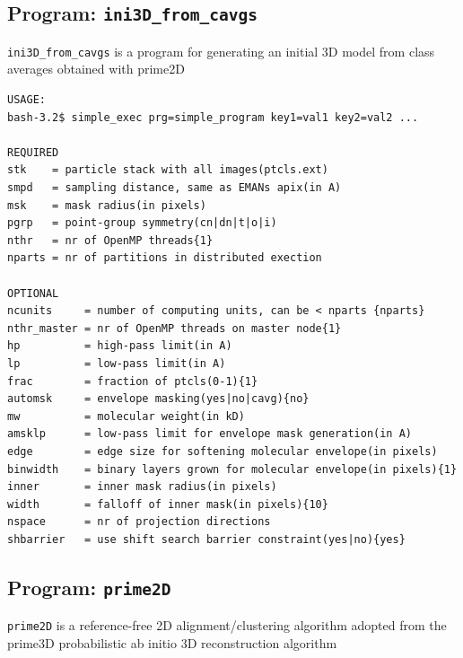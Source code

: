 \documentclass[a4paper,11pt]{article}
\newcommand{\prgname}[1]{\textcolor{NavyBlue}{\texttt{#1}}}
\begin{document}
\subsection{Program: \prgname{ini3D\_from\_cavgs}}
\label{ini3D_from_cavgs}
\prgname{ini3D\_from\_cavgs} is a program for generating an initial 3D model from class averages obtained with prime2D

\begin{verbatim}
USAGE:
bash-3.2$ simple_exec prg=simple_program key1=val1 key2=val2 ...

REQUIRED
stk    = particle stack with all images(ptcls.ext)
smpd   = sampling distance, same as EMANs apix(in A)
msk    = mask radius(in pixels)
pgrp   = point-group symmetry(cn|dn|t|o|i)
nthr   = nr of OpenMP threads{1}
nparts = nr of partitions in distributed exection

OPTIONAL
ncunits     = number of computing units, can be < nparts {nparts}
nthr_master = nr of OpenMP threads on master node{1}
hp          = high-pass limit(in A)
lp          = low-pass limit(in A)
frac        = fraction of ptcls(0-1){1}
automsk     = envelope masking(yes|no|cavg){no}
mw          = molecular weight(in kD)
amsklp      = low-pass limit for envelope mask generation(in A)
edge        = edge size for softening molecular envelope(in pixels)
binwidth    = binary layers grown for molecular envelope(in pixels){1}
inner       = inner mask radius(in pixels)
width       = falloff of inner mask(in pixels){10}
nspace      = nr of projection directions
shbarrier   = use shift search barrier constraint(yes|no){yes}
\end{verbatim}

\subsection{Program: \prgname{prime2D}}
\label{prime2D}
\prgname{prime2D} is a reference-free 2D alignment/clustering algorithm adopted from the prime3D probabilistic ab initio 3D reconstruction algorithm
\end{document}
